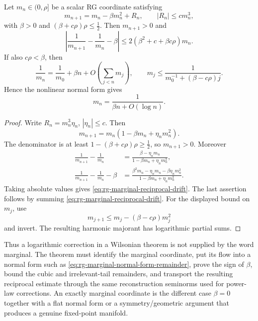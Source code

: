 \begin{lemma}
\label{lem:rg-marginally-irrelevant-reciprocal-estimate}
Let \(m_n\in(0,\rho]\) be a scalar RG coordinate satisfying
\begin{equation}
  m_{n+1}
  =
  m_n-\beta m_n^2+R_n,\qquad
  |R_n|\le c m_n^3,
  \label{eq:rg-marginal-normal-form-remainder}
\end{equation}
with \(\beta>0\) and
\((\beta+c\rho)\rho\le\frac12\).  Then \(m_{n+1}>0\) and
\begin{equation}
  \left|
    \frac1{m_{n+1}}-\frac1{m_n}-\beta
  \right|
  \le
  2(\beta^2+c+\beta c\rho)m_n .
  \label{eq:rg-marginal-reciprocal-drift}
\end{equation}
If also \(c\rho<\beta\), then
\[
  \frac1{m_n}
  =
  \frac1{m_0}+\beta n
  +O\!\left(\sum_{j<n}m_j\right),
  \qquad
  m_j\le
  \frac1{m_0^{-1}+(\beta-c\rho)j}.
\]
Hence the nonlinear normal form gives
\[
  m_n=\frac1{\beta n+O(\log n)} .
\]
\end{lemma}

\begin{proof}
Write \(R_n=m_n^3\eta_n\), \(|\eta_n|\le c\).  Then
\[
  m_{n+1}
  =
  m_n(1-\beta m_n+\eta_n m_n^2).
\]
The denominator is at least \(1-(\beta+c\rho)\rho\ge\frac12\), so
\(m_{n+1}>0\).  Moreover
\[
\begin{aligned}
  \frac1{m_{n+1}}-\frac1{m_n}
  &=
  \frac{\beta-\eta_n m_n}
       {1-\beta m_n+\eta_n m_n^2},\\
  \frac1{m_{n+1}}-\frac1{m_n}-\beta
  &=
  \frac{\beta^2m_n-\eta_n m_n-\beta\eta_n m_n^2}
       {1-\beta m_n+\eta_n m_n^2}.
\end{aligned}
\]
Taking absolute values gives
\eqref{eq:rg-marginal-reciprocal-drift}.  The last assertion follows by
summing \eqref{eq:rg-marginal-reciprocal-drift}.  For the displayed bound on
\(m_j\), use
\[
  m_{j+1}\le m_j-(\beta-c\rho)m_j^2
\]
and invert.  The resulting harmonic majorant has logarithmic partial sums.
\end{proof}

Thus a logarithmic correction in a Wilsonian theorem is not supplied by the
word marginal.  The theorem must identify the marginal coordinate, put its
flow into a normal form such as
\eqref{eq:rg-marginal-normal-form-remainder}, prove the sign of \(\beta\),
bound the cubic and irrelevant-tail remainders, and transport the resulting
reciprocal estimate through the same reconstruction seminorms used for
power-law corrections.  An exactly marginal coordinate is the different case
\(\beta=0\) together with a flat normal form or a symmetry/geometric argument
that produces a genuine fixed-point manifold.

